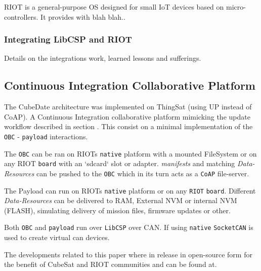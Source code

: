 RIOT is a general-purpose OS designed for small IoT devices based on micro-controllers.
It provides with blah blah..

\subsubsection{Integrating LibCSP and RIOT}

Details on the integrations work, learned lessons and sufferings.


\subsection{Continuous Integration \- Collaborative Platform}

The CubeDate architecture was implemented on ThingSat (using UP instead of CoAP).
A Continuous Integration collaborative platform mimicking the update workflow described
in section . This consist on a minimal implementation of the
\texttt{OBC} - \texttt{payload} interactions.

The \texttt{OBC} can be ran on RIOTs \texttt{native} platform with a mounted
FileSystem or on any RIOT \texttt{board} with an `sdcard` slot or adapter.
\textit{manifests} and matching \textit{Data-Resources} can be pushed to the
\texttt{OBC} which in its turn acts as a \texttt{CoAP} file-server.

The Payload can run on RIOTs \texttt{native} platform or on any \texttt{RIOT}
\texttt{board}. Different \textit{Data-Resources} can be delivered to RAM,
External NVM or internal NVM (FLASH), simulating delivery of mission files,
firmware updates or other.

Both \texttt{OBC} and \texttt{payload} run over \texttt{LibCSP} over CAN. If
using \texttt{native} \texttt{SocketCAN} is used to create virtual can
devices.


The developments related to this paper where in release in open-source form for
the benefit of CubeSat and RIOT communities and can be found at.
\fi

